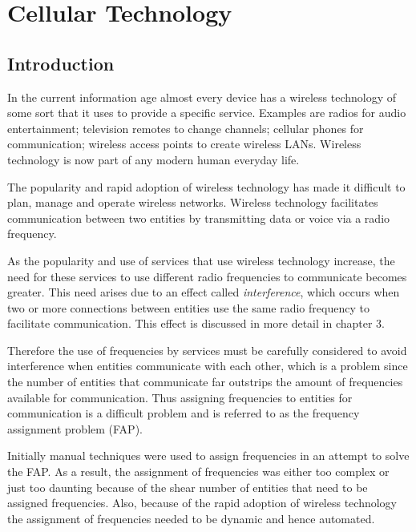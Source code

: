 \chapter{Cellular Technology}
\label{chpt:celltech}
\section{Introduction}
In the current information age  almost every device has a wireless technology of some sort that it uses to provide a specific service. Examples are radios for audio entertainment; television remotes to change channels; cellular phones for communication; wireless access points to create wireless LANs\cite{Karen2004}. Wireless technology is now part of any modern human everyday life.

The popularity and rapid adoption of wireless technology has made it difficult to plan, manage and operate wireless networks\cite{Karen2004,Eisenblatter,GSMArchitectureProtocolsServices,GSM92,wirelesstelcoMullet}. Wireless technology facilitates communication between two entities by transmitting data or voice via a radio frequency\cite{Karen2004,Eisenblatter,GSMArchitectureProtocolsServices,GSM92,wirelesstelcoMullet}. 

As the popularity and use of services that use wireless technology increase, the need for these services to use different radio frequencies to communicate becomes greater\cite{Karen2004,Eisenblatter,GSMArchitectureProtocolsServices,GSM92,wirelesstelcoMullet}. This need arises due to an effect called \emph{interference}, which occurs when two or more connections between entities use the same radio frequency to facilitate communication\cite{Karen2004,Eisenblatter,GSMArchitectureProtocolsServices,GSM92,wirelesstelcoMullet}. This effect is discussed in more detail in chapter 3.

Therefore the use of frequencies by services must be carefully considered to avoid interference when entities communicate with each other, which is a problem since the number of entities that communicate far outstrips the amount of frequencies available for communication\cite{Karen2004,Eisenblatter,GSMArchitectureProtocolsServices,GSM92,wirelesstelcoMullet}. Thus assigning frequencies to entities for communication is a difficult problem and is referred to as the frequency assignment problem (FAP)\cite{Karen2004,Eisenblatter,GSMArchitectureProtocolsServices,GSM92,wirelesstelcoMullet}.

Initially manual techniques were used to assign frequencies in an attempt to solve the FAP\cite{Karen2004,Eisenblatter,GSMArchitectureProtocolsServices,GSM92,wirelesstelcoMullet}. As a result, the assignment of frequencies was either too complex or just too daunting because of the shear number of entities that need to be assigned frequencies\cite{Karen2004,Eisenblatter,GSMArchitectureProtocolsServices,GSM92,wirelesstelcoMullet}. Also, because of the rapid adoption of wireless technology the assignment of frequencies needed to be dynamic and hence automated\cite{Karen2004,Eisenblatter,GSMArchitectureProtocolsServices,GSM92,wirelesstelcoMullet}.

